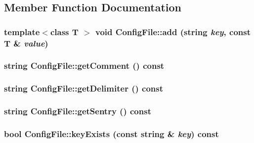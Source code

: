 \subsection{Member Function Documentation}
\hypertarget{classConfigFile_a19311cc5817f42b2f985f2c2b72b3424}{
\subsubsection[{add}]{\setlength{\rightskip}{0pt plus 5cm}template$<$class T $>$ void ConfigFile::add (string {\em key}, \/  const T \& {\em value})}}
\label{classConfigFile_a19311cc5817f42b2f985f2c2b72b3424}
\hypertarget{classConfigFile_a2b0cd50789ea83b1a12bf39293c7401a}{
\subsubsection[{getComment}]{\setlength{\rightskip}{0pt plus 5cm}string ConfigFile::getComment () const}}
\label{classConfigFile_a2b0cd50789ea83b1a12bf39293c7401a}
\hypertarget{classConfigFile_adcc1df41c7d669a7cc81c47b85b0ee14}{
\subsubsection[{getDelimiter}]{\setlength{\rightskip}{0pt plus 5cm}string ConfigFile::getDelimiter () const}}
\label{classConfigFile_adcc1df41c7d669a7cc81c47b85b0ee14}
\hypertarget{classConfigFile_adf270b0cf2a1b034fc18fd2e82296760}{
\subsubsection[{getSentry}]{\setlength{\rightskip}{0pt plus 5cm}string ConfigFile::getSentry () const}}
\label{classConfigFile_adf270b0cf2a1b034fc18fd2e82296760}
\hypertarget{classConfigFile_afd3d1146ae212a7e5802961f5ad3fe91}{
\subsubsection[{keyExists}]{\setlength{\rightskip}{0pt plus 5cm}bool ConfigFile::keyExists (const string \& {\em key}) const}}
